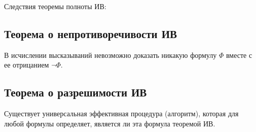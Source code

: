 Следствия теоремы полноты ИВ:

\subsection*{Теорема о непротиворечивости ИВ}
В исчислении высказываний невозможно доказать никакую формулу $\Phi$ вместе с ее отрицанием $\lnot\Phi$.

\subsection*{Теорема о разрешимости ИВ}
Существует универсальная эффективная процедура (алгоритм), которая для любой формулы определяет, является ли эта формула теоремой ИВ.